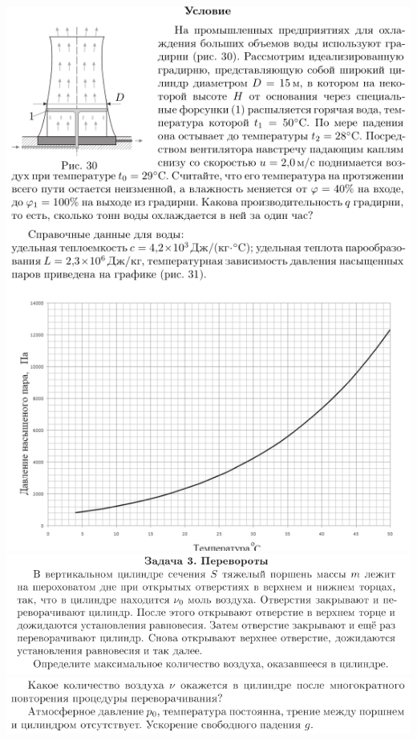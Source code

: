 \begin{center}
  \includegraphics[width=14cm]{reg20143}
  \includegraphics[width=14cm]{reg20132}
  \includegraphics[width=14cm]{reg20133}
\end{center}

\clearpage


